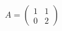 \documentclass[preview]{standalone}
\begin{document}
\begin{align*}
A = \begin{pmatrix}1 & 1 \\[6pt] 0 & 2\end{pmatrix}
\end{align*}
\end{document}
